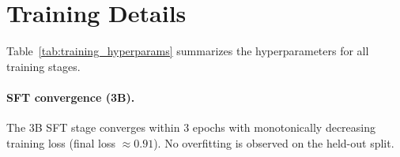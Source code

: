 \appendix

\section{Training Details}
\label{app:training}

Table~\ref{tab:training_hyperparams} summarizes the hyperparameters for all training stages.

\begin{table}[h]
\centering
\small
{}
\caption{Training hyperparameters for SFT and DPO stages. Both stages use LoRA (rank 32) on Qwen2.5-3B. The SFT stage uses partial-credit trajectories (inclusion: total\_em $\geq 1$); DPO stages use matched-sample preference pairs subsampled to 176 raw pairs.}
\label{tab:training_hyperparams}
\end{table}

\paragraph{SFT convergence (3B).}
The 3B SFT stage converges within 3 epochs with monotonically decreasing training loss (final loss $\approx 0.91$). No overfitting is observed on the held-out split.

